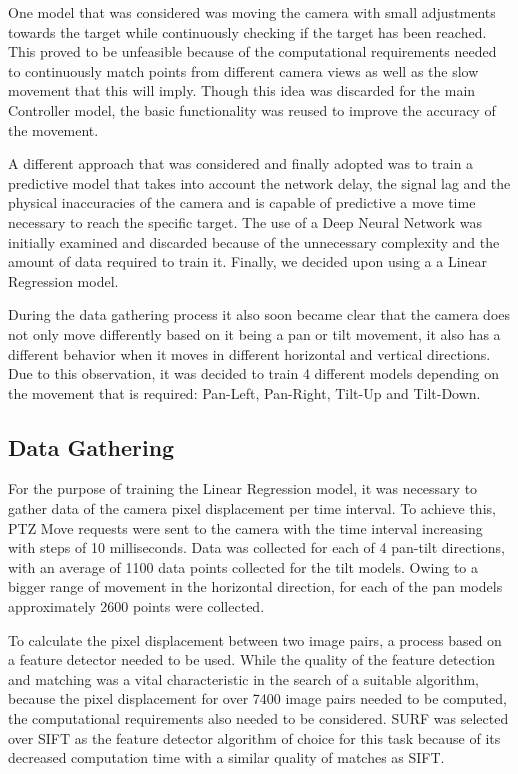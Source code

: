 \documentclass{l4proj}
\begin{document}
One model that was considered was moving the camera with small adjustments towards the target while continuously checking if the target has been reached. This proved to be unfeasible because of the computational requirements needed to continuously match points from  different camera views as well as the slow movement that this will imply. Though this idea was discarded for the main Controller model, the basic functionality was reused to improve the accuracy of the movement. 


A different approach that was considered and finally adopted was to train a predictive model that takes into account the network delay, the signal lag and the physical inaccuracies of the camera and is capable of predictive a move time necessary to reach the specific target. The use of a Deep Neural Network was initially examined and discarded because of the unnecessary complexity and the amount of data required to train it. Finally, we decided upon using a a Linear Regression model.

During the data gathering process it also soon became clear that the camera does not only move differently based on it being a pan or tilt movement, it also has a different behavior when it moves in different horizontal and vertical directions. Due to this observation, it was decided to train 4 different models depending on the movement that is required: Pan-Left, Pan-Right, Tilt-Up and Tilt-Down.  

\subsection{Data Gathering}

For the purpose of training the Linear Regression model, it was necessary to gather data of the camera pixel displacement per time interval. To achieve this, PTZ Move requests were sent to the camera with the time interval increasing with steps of 10 milliseconds. Data was collected for each of 4 pan-tilt directions, with an average of 1100 data points collected for the tilt models. Owing to a bigger range of movement in the horizontal direction, for each of the pan models approximately 2600 points were collected. 


To calculate the pixel displacement between two image pairs, a process based on a feature detector needed to be used. While the quality of the feature detection and matching was a vital characteristic in the search of a suitable algorithm, because the pixel displacement for over 7400 image pairs needed to be computed, the computational requirements also needed to be considered. SURF was selected over SIFT as the feature detector algorithm of choice for this task because of its decreased computation time with a similar quality of matches as SIFT. 
\end{document}
